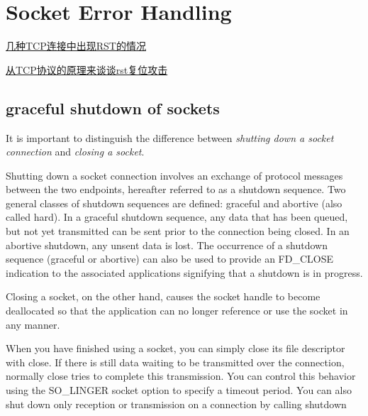 
\section{Socket Error Handling}

\href{http://my.oschina.net/costaxu/blog/127394}{几种TCP连接中出现RST的情况}


\href{http://russelltao.iteye.com/blog/1405349}{从TCP协议的原理来谈谈rst复位攻击}

\subsection{graceful shutdown of sockets}

 It is important to distinguish the difference between \emph{shutting down a
 socket connection} and \emph{closing a socket}.


Shutting down a socket connection involves an exchange of protocol messages between the two endpoints,
hereafter referred to as a shutdown sequence. 
Two general classes of shutdown sequences are defined: graceful and abortive (also called hard).
In a graceful shutdown sequence, any data that has been queued, but not yet transmitted can be sent prior to the connection being closed. 
In an abortive shutdown, any unsent data is lost. 
The occurrence of a shutdown sequence (graceful or abortive) can also be used to provide an FD_CLOSE indication to the associated applications signifying that a shutdown is in progress.

Closing a socket, on the other hand, causes the socket handle to become
deallocated so that the application can no longer reference or use the socket in any manner.


When you have finished using a socket, you can simply close its file descriptor with close. 
If there is still data waiting to be transmitted over the connection, normally close tries to complete this transmission. 
You can control this behavior using the SO\_LINGER socket option to specify a timeout period. 
You can also shut down only reception or transmission on a connection by calling shutdown




